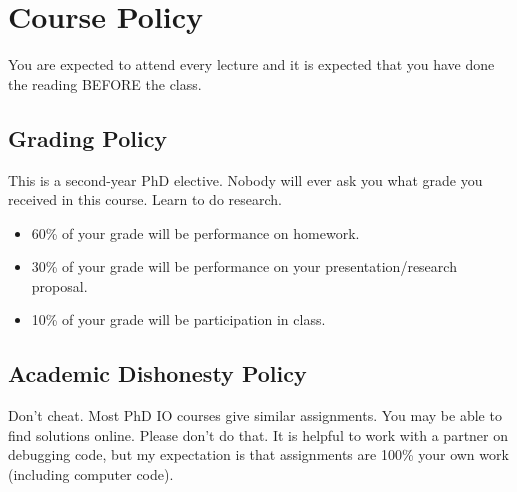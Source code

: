 \documentclass[11pt]{article}
\begin{document}
\section*{Course Policy}
You are expected to attend every lecture and it is expected that you have done the reading BEFORE the class.
\subsection*{Grading Policy}
This is a second-year PhD elective. Nobody will ever ask you what grade you received in this course. Learn to do research.
\begin{itemize}
\item 60\% of your grade will be performance on homework.
\item 30\% of your grade will be performance on your presentation/research proposal.
\item 10\% of your grade will be participation in class.
\end{itemize}

\subsection*{Academic Dishonesty Policy}
Don't cheat. Most PhD IO courses give similar assignments. You may be able to find solutions online. Please don't do that. It is helpful to work with a partner on debugging code, but my expectation is that assignments are 100\% your own work (including computer code).

\newpage
\end{document}

